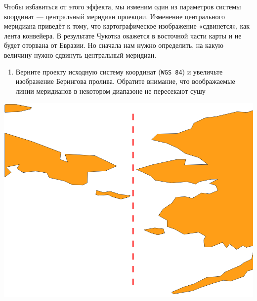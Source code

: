 \documentclass[
  12pt,
]{book}
\providecommand{\tightlist}{%
  \setlength{\itemsep}{0pt}\setlength{\parskip}{0pt}}
\begin{document}
Чтобы избавиться от этого эффекта, мы изменим один из параметров системы координат --- центральный меридиан проекции. Изменение центрального меридиана приведёт к тому, что картографическое изображение «сдвинется», как лента конвейера. В результате Чукотка окажется в восточной части карты и не будет оторвана от Евразии. Но сначала нам нужно определить, на какую величину нужно сдвинуть центральный меридиан.

\begin{enumerate}
\def\labelenumi{\arabic{enumi}.}
\setcounter{enumi}{3}
\tightlist
\item
  Верните проекту исходную систему координат (\texttt{WGS\ 84}) и увеличьте изображение Берингова пролива. Обратите внимание, что воображаемые линии меридианов в некотором диапазоне не пересекают сушу
\end{enumerate}

\includegraphics{images/Ex01_WorldMap/bering.png}
\end{document}
